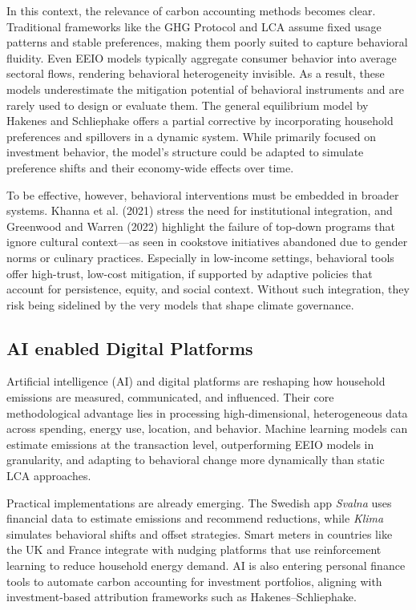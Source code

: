 \documentclass[12pt,a4paper]{article}%
\begin{document}
In this context, the relevance of carbon accounting methods becomes clear. Traditional frameworks like the GHG Protocol and LCA assume fixed usage patterns and stable preferences, making them poorly suited to capture behavioral fluidity. Even EEIO models typically aggregate consumer behavior into average sectoral flows, rendering behavioral heterogeneity invisible. As a result, these models underestimate the mitigation potential of behavioral instruments and are rarely used to design or evaluate them. The general equilibrium model by Hakenes and Schliephake offers a partial corrective by incorporating household preferences and spillovers in a dynamic system. While primarily focused on investment behavior, the model’s structure could be adapted to simulate preference shifts and their economy-wide effects over time. 

To be effective, however, behavioral interventions must be embedded in broader systems. Khanna et al. (2021) stress the need for institutional integration, and Greenwood and Warren (2022) highlight the failure of top-down programs that ignore cultural context—as seen in cookstove initiatives abandoned due to gender norms or culinary practices. Especially in low-income settings, behavioral tools offer high-trust, low-cost mitigation, if supported by adaptive policies that account for persistence, equity, and social context. Without such integration, they risk being sidelined by the very models that shape climate governance.
\subsection{AI enabled Digital Platforms}

Artificial intelligence (AI) and digital platforms are reshaping how household emissions are measured, communicated, and influenced. Their core methodological advantage lies in processing high-dimensional, heterogeneous data across spending, energy use, location, and behavior. Machine learning models can estimate emissions at the transaction level, outperforming EEIO models in granularity, and adapting to behavioral change more dynamically than static LCA approaches.

Practical implementations are already emerging. The Swedish app \textit{Svalna} uses financial data to estimate emissions and recommend reductions, while \textit{Klima} simulates behavioral shifts and offset strategies. Smart meters in countries like the UK and France integrate with nudging platforms that use reinforcement learning to reduce household energy demand. AI is also entering personal finance tools to automate carbon accounting for investment portfolios, aligning with investment-based attribution frameworks such as Hakenes--Schliephake.
\end{document}
